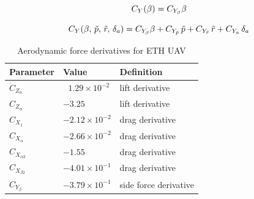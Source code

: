 \begin{equation}{\label{eqn:lateralCoeffETHcraft}}
C_Y(\beta) = C_{Y_\beta} \beta
\end{equation}

\begin{equation}{\label{eqn:lateralCoeffMAKO}}
C_Y(\beta, \, \tilde{p}, \, \tilde{r}, \, \delta_a) = C_{Y_\beta} \beta + C_{Y_{\tilde{p}}} \, \tilde{p} + C_{Y_{\tilde{r}}} \, \tilde{r} + C_{Y_a} \, \delta_a 
\end{equation}

\begin{table}
\label{arm:forcesETHcraft}
\caption{Aerodynamic force derivatives for ETH UAV \cite{ducard2009fault}}
\label{arm:ethcraft}
\begin{center}
\begin{tabular}{ ||p{3cm}|p{3cm}|p{4cm}||}\hline
\textbf{Parameter} & \textbf{Value} & \textbf{Definition} \\\hline
$C_{Z_0}$                             & $\ \ \,1.29 \times 10^{-2}$	   & lift derivative \\\hline
$C_{Z_{\alpha}}$                   & $-3.25 $                                 & lift derivative \\\hline
$C_{X_1}$                             & $-2.12 \times 10^{-2}$	   & drag derivative \\\hline
$C_{X_{\alpha}}$                   & $-2.66 \times 10^{-2}$          & drag derivative \\\hline
$C_{X_{\alpha 2}}$                & $-1.55 $	                            & drag derivative \\\hline
$C_{X_{\beta 2}} $                 & $-4.01 \times 10^{-1}$	   & drag derivative \\\hline
$C_{Y_\beta} $                      & $-3.79 \times 10^{-1}$          & side force derivative \\\hline
\end{tabular}
\end{center}
\end{table}


